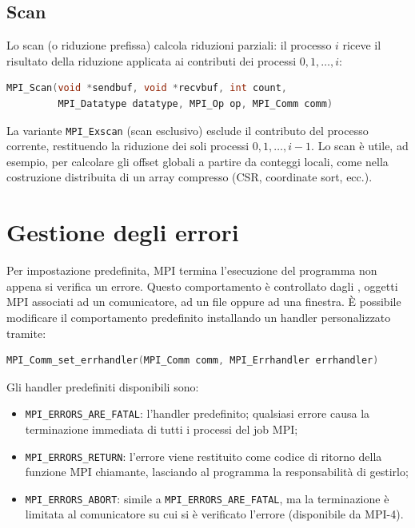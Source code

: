 \subsection{Scan}
Lo scan (o riduzione prefissa) calcola riduzioni parziali: il processo \(i\) riceve il risultato della riduzione applicata ai contributi dei processi \(0, 1, \ldots, i\):
\begin{lstlisting}[language=C, numbers=none]
MPI_Scan(void *sendbuf, void *recvbuf, int count,
         MPI_Datatype datatype, MPI_Op op, MPI_Comm comm)
\end{lstlisting}
La variante \texttt{MPI\_Exscan} (scan esclusivo) esclude il contributo del processo corrente, restituendo la riduzione dei soli processi \(0, 1, \ldots, i-1\). Lo scan è utile, ad esempio, per calcolare gli offset globali a partire da conteggi locali, come nella costruzione distribuita di un array compresso (CSR, coordinate sort, ecc.).

\section{Gestione degli errori} 
Per impostazione predefinita, MPI termina l'esecuzione del programma non appena si verifica un errore. 
Questo comportamento è controllato dagli , oggetti MPI associati ad un comunicatore, ad un file oppure ad una finestra. È possibile modificare il comportamento predefinito installando un handler personalizzato tramite:
\begin{lstlisting}[language=C, numbers=none]
MPI_Comm_set_errhandler(MPI_Comm comm, MPI_Errhandler errhandler)
\end{lstlisting}
Gli handler predefiniti disponibili sono:
\begin{itemize}
    \item \texttt{MPI\_ERRORS\_ARE\_FATAL}: l'handler predefinito; qualsiasi errore causa la terminazione immediata di tutti i processi del job MPI;
    \item \texttt{MPI\_ERRORS\_RETURN}: l'errore viene restituito come codice di ritorno della funzione MPI chiamante, lasciando al programma la responsabilità di gestirlo;
    \item \texttt{MPI\_ERRORS\_ABORT}: simile a \texttt{MPI\_ERRORS\_ARE\_FATAL}, ma la terminazione è limitata al comunicatore su cui si è verificato l'errore (disponibile da MPI-4).
\end{itemize}

